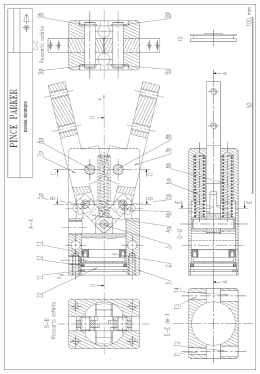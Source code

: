 \documentclass[11pt,oneside]{article}
\begin{document}
\begin{center}
\includegraphics[height=\textheight]{png/plan}
\end{center}
\end{document}
